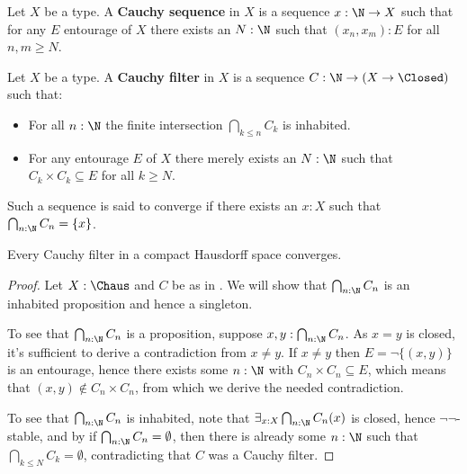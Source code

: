 \begin{definition}
  Let $X$ be a type. A \textbf{Cauchy sequence} in $X$ is a sequence $x:\N \to X$ such that for any $E$ entourage of $X$ there exists an $N:\N$ such that $(x_n,x_m):E$ for all $n,m\geq N$. 
\end{definition}

\begin{definition}\label{dfnCauchyFilter}
  Let $X$ be a type. A \textbf{Cauchy filter} in $X$ is a sequence $C:\N \to (X \to \Closed)$ such that:
  \begin{itemize}
    \item For all $n:\N$ the finite intersection $\bigcap_{k\leq n} C_k$ is inhabited. 
    \item For any entourage $E$ of $X$ there merely exists an $N:\N$ such that $C_k \times C_k \subseteq E$ for all $k\geq N$. 
  \end{itemize}
  Such a sequence is said to converge if there exists an $x:X$ such that $\bigcap_{n:\N} C_n = \{x\}$. 
\end{definition}
\begin{lemma}
  Every Cauchy filter in a compact Hausdorff space converges. 
\end{lemma}
\begin{proof}
  Let $X:\Chaus$ and $C$ be as in . We will show that $\bigcap_{n:\N} C_n$ is an inhabited proposition and hence a singleton. 
\item To see that $\bigcap_{n:\N} C_n$ is a proposition, suppose $x,y:\bigcap_{n:\N} C_n$. As $x=y$ is closed, %
  it's sufficient to derive a contradiction from $x \neq y$. If $x \neq y$ then $E= \neg\{(x,y)\}$ is an entourage, hence there exists some $n:\N$ with $C_n \times C_n \subseteq E$, which means that $(x,y) \notin C_n \times C_n$, from which we derive the needed contradiction. 
\item To see that $\bigcap_{n:\N} C_n$ is inhabited, note that $\exists_{x:X} \bigcap_{n:\N} C_n(x)$ is closed, hence $\neg\neg$-stable, and by  if $\bigcap_{n:\N} C_n  = \emptyset$, then there is already some $n:\N$ such that $\bigcap_{k\leq N} C_k = \emptyset$, contradicting that $C$ was a Cauchy filter. 
\end{proof}


